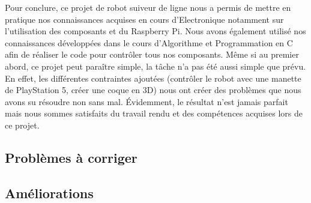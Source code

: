 Pour conclure, ce projet de robot suiveur de ligne nous a permis de mettre en pratique nos connaissances acquises en cours d'Electronique notamment sur l'utilisation des composants et du Raspberry Pi. Nous avons également utilisé nos connaissances développées dans le cours d'Algorithme et Programmation en C afin de réaliser le code pour contrôler tous nos composants.
Même si au premier abord, ce projet peut paraître simple, la tâche n'a pas été aussi simple que prévu. En effet, les différentes contraintes ajoutées (contrôler le robot avec une manette de PlayStation 5, créer une coque en 3D) nous ont créer des problèmes que nous avons su résoudre non sans mal.
Évidemment, le résultat n'est jamais parfait mais nous sommes satisfaits du travail rendu et des compétences acquises lors de ce projet.

\subsection{Problèmes à corriger}

\subsection{Améliorations}
